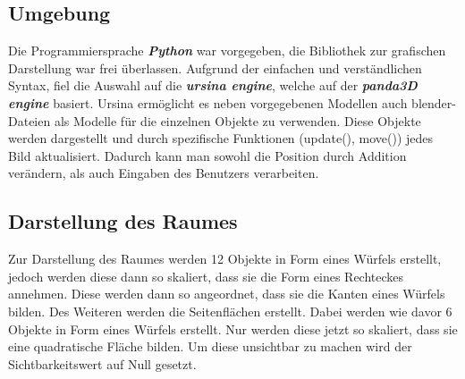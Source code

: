\documentclass[a4paper, 12pt]{article}
\begin{document}
	\subsection{Umgebung}
		Die Programmiersprache \emph{\textbf{Python}} war vorgegeben, die Bibliothek zur grafischen Darstellung war frei überlassen. Aufgrund der einfachen und verständlichen Syntax, fiel die Auswahl auf die \emph{\textbf{ursina engine}}, welche auf der \emph{\textbf{panda3D engine}} basiert. Ursina ermöglicht es neben vorgegebenen Modellen auch blender-Dateien als Modelle für die einzelnen Objekte zu verwenden. Diese Objekte werden dargestellt und durch spezifische Funktionen (update(), move()) jedes Bild aktualisiert. Dadurch kann man sowohl die Position durch Addition verändern, als auch Eingaben des Benutzers verarbeiten. 
	
	\subsection{Darstellung des Raumes}
		Zur Darstellung des Raumes werden 12 Objekte in Form eines Würfels erstellt, jedoch werden diese dann so skaliert, dass sie die Form eines Rechteckes annehmen. Diese werden dann so angeordnet, dass sie die Kanten eines Würfels bilden. 
		Des Weiteren werden die Seitenflächen erstellt. Dabei werden wie davor 6 Objekte in Form eines Würfels erstellt. Nur werden diese jetzt so skaliert, dass sie eine quadratische Fläche bilden. Um diese unsichtbar zu machen wird der Sichtbarkeitswert auf Null gesetzt.
		
\end{document}
